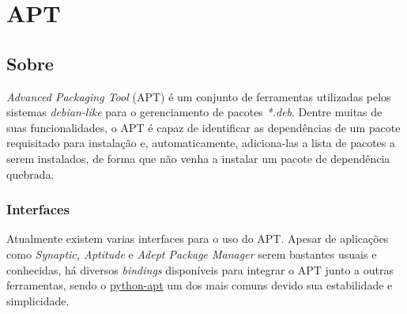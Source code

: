 \section*{APT} %
\label{sec:apt}

\subsection*{Sobre} %
\label{sub:sobre}
\textit{Advanced Packaging Tool} (APT) é um conjunto de ferramentas utilizadas pelos sistemas \textit{debian-like} para o gerenciamento de pacotes \textit{*.deb}. Dentre muitas de suas funcionalidades, o APT é capaz de identificar as dependências de um pacote requisitado para instalação e, automaticamente, adiciona-las a lista de pacotes a serem instalados, de forma que não venha a instalar um pacote de dependência quebrada.

\subsubsection*{Interfaces} %
\label{ssub:interfaces}
Atualmente existem varias interfaces para o uso do APT. Apesar de aplicações como \textit{Synaptic, Aptitude} e \textit{Adept Package Manager} serem bastantes usuais e conhecidas, há diversos \textit{bindings} disponíveis para integrar o APT junto a outras ferramentas, sendo o \href{https://apt.alioth.debian.org/python-apt-doc/library/index.html}{python-apt} um dos mais comuns  devido sua estabilidade e simplicidade.


